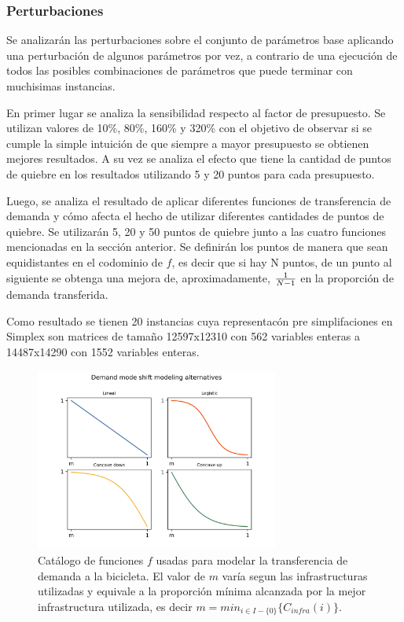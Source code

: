 \documentclass{article}
\begin{document}
  \subsubsection*{Perturbaciones}

  Se analizarán las perturbaciones sobre el conjunto de parámetros base aplicando una perturbación de algunos parámetros por vez, a contrario de una ejecución de todos las posibles combinaciones de parámetros que puede terminar con muchisimas instancias.

  En primer lugar se analiza la sensibilidad respecto al factor de presupuesto. Se utilizan valores de 10\%, 80\%, 160\% y 320\% con el objetivo de observar si se cumple la simple intuición de que siempre a mayor presupuesto se obtienen mejores resultados. A su vez se analiza el efecto que tiene la cantidad de puntos de quiebre en los resultados utilizando 5 y 20 puntos para cada presupuesto.

  Luego, se analiza el resultado de aplicar diferentes funciones de transferencia de demanda y cómo afecta el hecho de utilizar diferentes cantidades de puntos de quiebre. Se utilizarán 5, 20 y 50 puntos de quiebre junto a las cuatro funciones mencionadas en la sección anterior. Se definirán los puntos de manera que sean equidistantes en el codominio de $f$, es decir que si hay N puntos, de un punto al siguiente se obtenga una mejora de, aproximadamente, ${1 \over N - 1}$ en la proporción de demanda transferida.

  Como resultado se tienen 20 instancias cuya representacón pre simplifaciones en Simplex son matrices de tamaño 12597x12310 con 562 variables enteras a 14487x14290 con 1552 variables enteras.

  \begin{figure}[h!]
    \centering
    \includegraphics[width=8cm]{../resources/f_catalog.png}
      \caption{Catálogo de funciones $f$ usadas para modelar la transferencia de demanda a la bicicleta. El valor de $m$ varía segun las infrastructuras utilizadas y equivale a la proporción mínima alcanzada por la mejor infrastructura utilizada, es decir $m = min_{i \in I - \{0\}} \{ C_{infra}(i) \}$.}
    \label{fig:fcatalog}
  \end{figure}
\end{document}
